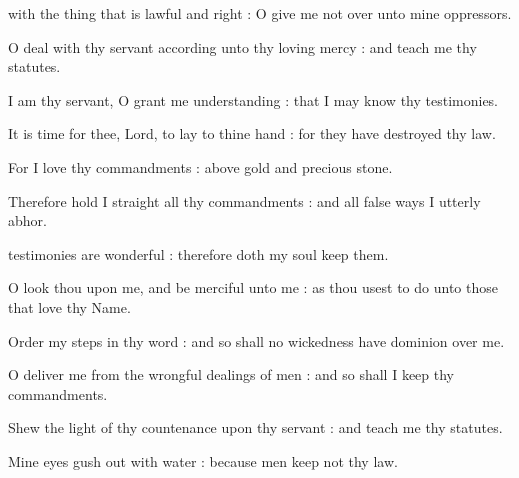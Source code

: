  with the thing that is lawful and right : O give me not over unto mine oppressors.\par
{}
O deal with thy servant according unto thy loving mercy : and teach me thy statutes.\par
{}I am thy servant, O grant me understanding : that I may know thy testimonies.\par
{}It is time for thee, Lord, to lay to thine hand : for they have destroyed thy law.\par
{}For I love thy commandments : above gold and precious stone.\par
{}Therefore hold I straight all thy commandments : and all false ways I utterly abhor.\par

 testimonies are wonderful : therefore doth my soul keep them.\par
{}
O look thou upon me, and be merciful unto me : as thou usest to do unto those that love thy Name.\par
{}Order my steps in thy word : and so shall no wickedness have dominion over me.\par
{}O deliver me from the wrongful dealings of men : and so shall I keep thy commandments.\par
{}Shew the light of thy countenance upon thy servant : and teach me thy statutes.\par
{}Mine eyes gush out with water : because men keep not thy law.\par

